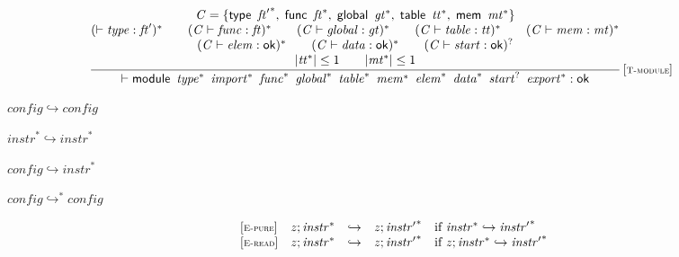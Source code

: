 $$
\begin{array}{@{}c@{}}\displaystyle
\frac{
\begin{array}{@{}c@{}}
{\mathit{C}} = \{ \begin{array}[t]{@{}l@{}}
\mathsf{type}~\,{{\mathit{ft}'}^\ast},\; \mathsf{func}~\,{{\mathit{ft}}^\ast},\; \mathsf{global}~\,{{\mathit{gt}}^\ast},\; \mathsf{table}~\,{{\mathit{tt}}^\ast},\; \mathsf{mem}~\,{{\mathit{mt}}^\ast} \}\end{array}
 \\
({ \vdash }\;{\mathit{type}} : {\mathit{ft}'})^\ast
 \qquad
({\mathit{C}} \vdash {\mathit{func}} : {\mathit{ft}})^\ast
 \qquad
({\mathit{C}} \vdash {\mathit{global}} : {\mathit{gt}})^\ast
 \qquad
({\mathit{C}} \vdash {\mathit{table}} : {\mathit{tt}})^\ast
 \qquad
({\mathit{C}} \vdash {\mathit{mem}} : {\mathit{mt}})^\ast
 \\
({\mathit{C}} \vdash {\mathit{elem}} : \mathsf{ok})^\ast
 \qquad
({\mathit{C}} \vdash {\mathit{data}} : \mathsf{ok})^\ast
 \qquad
({\mathit{C}} \vdash {\mathit{start}} : \mathsf{ok})^?
 \\
{|{{\mathit{tt}}^\ast}|} \leq 1
 \qquad
{|{{\mathit{mt}}^\ast}|} \leq 1
\end{array}
}{
{ \vdash }\;\mathsf{module}~\,{{\mathit{type}}^\ast}~\,{{\mathit{import}}^\ast}~\,{{\mathit{func}}^\ast}~\,{{\mathit{global}}^\ast}~\,{{\mathit{table}}^\ast}~\,{{\mathit{mem}}^\ast}~\,{{\mathit{elem}}^\ast}~\,{{\mathit{data}}^\ast}~\,{{\mathit{start}}^?}~\,{{\mathit{export}}^\ast} : \mathsf{ok}
} \, {[\textsc{\scriptsize T{-}module}]}
\qquad
\end{array}
$$

$\boxed{{\mathit{config}} \hookrightarrow {\mathit{config}}}$

$\boxed{{{\mathit{instr}}^\ast} \hookrightarrow {{\mathit{instr}}^\ast}}$

$\boxed{{\mathit{config}} \hookrightarrow {{\mathit{instr}}^\ast}}$

$\boxed{{\mathit{config}} \hookrightarrow^\ast {\mathit{config}}}$

$$
\begin{array}{@{}l@{}lcl@{}l@{}}
{[\textsc{\scriptsize E{-}pure}]} \quad & {\mathit{z}} ; {{\mathit{instr}}^\ast} &\hookrightarrow& {\mathit{z}} ; {{\mathit{instr}'}^\ast} &\quad
  \mbox{if}~{{\mathit{instr}}^\ast} \hookrightarrow {{\mathit{instr}'}^\ast} \\
{[\textsc{\scriptsize E{-}read}]} \quad & {\mathit{z}} ; {{\mathit{instr}}^\ast} &\hookrightarrow& {\mathit{z}} ; {{\mathit{instr}'}^\ast} &\quad
  \mbox{if}~{\mathit{z}} ; {{\mathit{instr}}^\ast} \hookrightarrow {{\mathit{instr}'}^\ast} \\
\end{array}
$$

